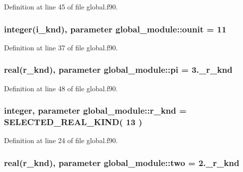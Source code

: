 Definition at line 45 of file global.\-f90.

\hypertarget{classglobal__module_a3d8941f8c329162cde48206e253955f5}{
\subsubsection[{ounit}]{\setlength{\rightskip}{0pt plus 5cm}integer({\bf i\-\_\-knd}), parameter global\-\_\-module\-::ounit = 11}}\label{classglobal__module_a3d8941f8c329162cde48206e253955f5}


Definition at line 37 of file global.\-f90.

\hypertarget{classglobal__module_ac248f55c9fa522378b386ab9456aec4e}{
\subsubsection[{pi}]{\setlength{\rightskip}{0pt plus 5cm}real({\bf r\-\_\-knd}), parameter global\-\_\-module\-::pi = 3.\-\_\-r\-\_\-knd}}\label{classglobal__module_ac248f55c9fa522378b386ab9456aec4e}


Definition at line 48 of file global.\-f90.

\hypertarget{classglobal__module_ab88bc58495adcaa0c39aac0c541fe8c8}{
\subsubsection[{r\-\_\-knd}]{\setlength{\rightskip}{0pt plus 5cm}integer, parameter global\-\_\-module\-::r\-\_\-knd = S\-E\-L\-E\-C\-T\-E\-D\-\_\-\-R\-E\-A\-L\-\_\-\-K\-I\-N\-D( 13 )}}\label{classglobal__module_ab88bc58495adcaa0c39aac0c541fe8c8}


Definition at line 24 of file global.\-f90.

\hypertarget{classglobal__module_ae882a53fa5147b5a17b1de231a9edc1e}{
\subsubsection[{two}]{\setlength{\rightskip}{0pt plus 5cm}real({\bf r\-\_\-knd}), parameter global\-\_\-module\-::two = 2.\-\_\-r\-\_\-knd}}\label{classglobal__module_ae882a53fa5147b5a17b1de231a9edc1e}


